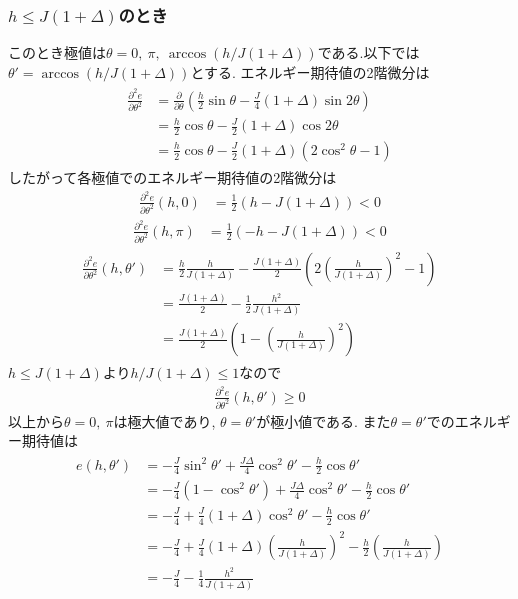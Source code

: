 \documentclass[uplatex,a4j,11pt,dvipdfmx]{jsarticle}
\begin{document}
\subsubsection*{$h\leq J(1+\Delta)$のとき}
このとき極値は$\theta=0,\ \pi,\ \arccos(h/J(1+\Delta))$である.以下では$\theta'=\arccos(h/J(1+\Delta))$とする.
エネルギー期待値の2階微分は
\begin{align}
  \begin{split}
    \frac{\partial^2 e}{\partial\theta^2}&=\frac{\partial}{\partial\theta}\left(\frac{h}{2}\sin\theta-\frac{J}{4}(1+\Delta)\sin2\theta\right)\\
    &=\frac{h}{2}\cos\theta-\frac{J}{2}(1+\Delta)\cos2\theta\\
    &=\frac{h}{2}\cos\theta-\frac{J}{2}(1+\Delta)\left(2\cos^2\theta-1\right)
  \end{split}
\end{align}
したがって各極値でのエネルギー期待値の2階微分は
\begin{align}
  \frac{\partial^2 e}{\partial\theta^2}(h,0)&=\frac{1}{2}\left(h-J(1+\Delta)\right)<0
\end{align}
\begin{align}
  \frac{\partial^2 e}{\partial\theta^2}(h,\pi)&=\frac{1}{2}\left(-h-J(1+\Delta)\right)<0
\end{align}
\begin{align}
  \begin{split}
    \frac{\partial^2 e}{\partial\theta^2}(h,\theta')&=\frac{h}{2}\frac{h}{J(1+\Delta)}-\frac{J(1+\Delta)}{2}\left(2\left(\frac{h}{J(1+\Delta)}\right)^2-1\right)\\
    &=\frac{J(1+\Delta)}{2}-\frac{1}{2}\frac{h^2}{J(1+\Delta)}\\
    &=\frac{J(1+\Delta)}{2}\left(1-\left(\frac{h}{J(1+\Delta)}\right)^2\right)
  \end{split}
\end{align}
$h\leq J(1+\Delta)$より$h/J(1+\Delta)\leq1$なので
\begin{align}
  \frac{\partial^2 e}{\partial\theta^2}(h,\theta')\geq0
\end{align}
以上から$\theta=0,\ \pi$は極大値であり, $\theta=\theta'$が極小値である.
また$\theta=\theta'$でのエネルギー期待値は
\begin{align}
  \begin{split}
    e(h,\theta')&=-\frac{J}{4}\sin^2\theta'+\frac{J\Delta}{4}\cos^2\theta'-\frac{h}{2}\cos\theta'\\
    &=-\frac{J}{4}\left(1-\cos^2\theta'\right)+\frac{J\Delta}{4}\cos^2\theta'-\frac{h}{2}\cos\theta'\\
    &=-\frac{J}{4}+\frac{J}{4}(1+\Delta)\cos^2\theta'-\frac{h}{2}\cos\theta'\\
    &=-\frac{J}{4}+\frac{J}{4}(1+\Delta)\left(\frac{h}{J(1+\Delta)}\right)^2-\frac{h}{2}\left(\frac{h}{J(1+\Delta)}\right)\\
    &=-\frac{J}{4}-\frac{1}{4}\frac{h^2}{J(1+\Delta)}
  \end{split}
\end{align}
\end{document}
